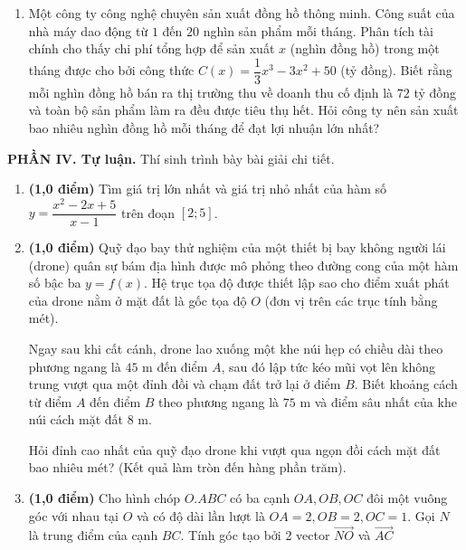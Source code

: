\documentclass[12pt]{article}
\begin{document}
\begin{enumerate}[label=\textbf{Câu \arabic*.}, leftmargin=*]
		\item Một công ty công nghệ chuyên sản xuất đồng hồ thông minh. Công suất của nhà máy dao động từ $1$ đến $20$ nghìn sản phẩm mỗi tháng. Phân tích tài chính cho thấy chi phí tổng hợp để sản xuất $x$ (nghìn đồng hồ) trong một tháng được cho bởi công thức $C(x) = \dfrac{1}{3}x^3 - 3x^2 + 50$ (tỷ đồng). Biết rằng mỗi nghìn đồng hồ bán ra thị trường thu về doanh thu cố định là $72$ tỷ đồng và toàn bộ sản phẩm làm ra đều được tiêu thụ hết. Hỏi công ty nên sản xuất bao nhiêu nghìn đồng hồ mỗi tháng để đạt lợi nhuận lớn nhất?
		\vspace{2mm}
		
	\end{enumerate}
	
	\vspace{4mm}
	\noindent\textbf{PHẦN IV. Tự luận.} Thí sinh trình bày bài giải chi tiết.
	\vspace{2mm}
	
	\begin{enumerate}[label=\textbf{Bài \arabic*.}, leftmargin=*]
		
		\item \textbf{(1,0 điểm)} Tìm giá trị lớn nhất và giá trị nhỏ nhất của hàm số $y = \dfrac{x^2 - 2x + 5}{x - 1}$ trên đoạn $[2; 5]$.
		\vspace{2mm}
		
		\item \textbf{(1,0 điểm)} Quỹ đạo bay thử nghiệm của một thiết bị bay không người lái (drone) quân sự bám địa hình được mô phỏng theo đường cong của một hàm số bậc ba $y = f(x)$. Hệ trục tọa độ được thiết lập sao cho điểm xuất phát của drone nằm ở mặt đất là gốc tọa độ $O$ (đơn vị trên các trục tính bằng mét). 
		
		Ngay sau khi cất cánh, drone lao xuống một khe núi hẹp có chiều dài theo phương ngang là $45$ m đến điểm $A$, sau đó lập tức kéo mũi vọt lên không trung vượt qua một đỉnh đồi và chạm đất trở lại ở điểm $B$. Biết khoảng cách từ điểm $A$ đến điểm $B$ theo phương ngang là $75$ m và điểm sâu nhất của khe núi cách mặt đất $8$ m. 
		
		Hỏi đỉnh cao nhất của quỹ đạo drone khi vượt qua ngọn đồi cách mặt đất bao nhiêu mét? (Kết quả làm tròn đến hàng phần trăm).
		\vspace{2mm}
		
		\item \textbf{(1,0 điểm)} Cho hình chóp $O.ABC$ có ba cạnh $OA, OB, OC$ đôi một vuông góc với nhau tại $O$ và có độ dài lần lượt là $OA = 2, OB = 2, OC = 1$. Gọi $N$ là trung điểm của cạnh $BC$. Tính góc tạo bởi 2 vector $\overrightarrow{NO}$ và $\overrightarrow{AC}$
		
	\end{enumerate}
	
\end{document}
